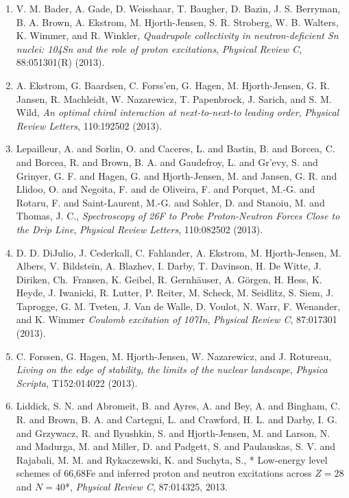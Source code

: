 \documentclass[%
oneside,                 %
final,                   %
10pt]{article}
\begin{document}
\begin{enumerate}
\item V. M. Bader, A. Gade, D. Weisshaar, T. Baugher, D. Bazin, J. S. Berryman, B. A. Brown, A. Ekstrom, M. Hjorth-Jensen, S. R. Stroberg, W. B. Walters, K. Wimmer, and R. Winkler,   \emph{Quadrupole collectivity in neutron-deficient Sn nuclei: 104Sn and the role of proton excitations},   \emph{Physical Review C},  88:051301(R) (2013). 

\item A. Ekstrom, G. Baardsen, C. Forss'en, G. Hagen, M. Hjorth-Jensen, G. R. Jansen, R. Machleidt, W. Nazarewicz, T. Papenbrock, J. Sarich, and S. M. Wild,   \emph{An optimal chiral interaction at next-to-next-to leading order},   \emph{Physical Review Letters},  110:192502 (2013).  

\item Lepailleur, A. and Sorlin, O. and Caceres, L. and Bastin, B. and Borcea, C. and Borcea, R. and Brown, B. A. and Gaudefroy, L. and Gr'evy, S. and Grinyer, G. F. and Hagen, G. and Hjorth-Jensen, M. and Jansen, G. R. and Llidoo, O. and Negoita, F. and de Oliveira, F. and Porquet, M.-G. and Rotaru, F. and Saint-Laurent, M.-G. and Sohler, D. and Stanoiu, M. and Thomas, J. C.,  \emph{Spectroscopy of 26F to Probe Proton-Neutron Forces Close to the Drip Line},   \emph{Physical Review Letters},  110:082502 (2013). 

\item D. D. DiJulio, J. Cederkall, C. Fahlander, A. Ekstrom, M. Hjorth-Jensen, M. Albers, V. Bildstein, A. Blazhev, I. Darby, T. Davinson, H. De Witte, J. Diriken, Ch.~Fransen, K. Geibel, R. Gernhäuser, A. Görgen, H. Hess, K. Heyde, J. Iwanicki, R. Lutter, P. Reiter, M. Scheck, M. Seidlitz, S. Siem, J. Taprogge, G. M. Tveten, J. Van de Walle, D. Voulot, N. Warr, F. Wenander, and K. Wimmer  \emph{Coulomb excitation of 107In},   \emph{Physical Review C},  87:017301 (2013).   

\item C. Forssen, G. Hagen, M. Hjorth-Jensen, W. Nazarewicz, and J. Rotureau,  \emph{Living on the edge of stability, the limits of the nuclear landscape},   \emph{Physica Scripta},  T152:014022 (2013). 

\item Liddick, S. N. and Abromeit, B. and Ayres, A. and Bey, A. and Bingham, C. R. and Brown, B. A. and Cartegni, L. and Crawford, H. L. and Darby, I. G. and Grzywacz, R. and Ilyushkin, S. and Hjorth-Jensen, M. and Larson, N. and Madurga, M. and Miller, D. and Padgett, S. and Paulauskas, S. V. and Rajabali, M. M. and Rykaczewski, K. and Suchyta, S.,  * Low-energy level schemes of 66,68Fe and inferred proton and neutron excitations across $Z=28$ and $N=40$*,   \emph{Physical Review C},  87:014325, 2013.  


\end{enumerate}
\end{document}
